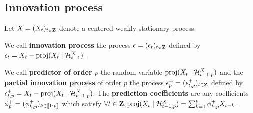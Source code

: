 \subsection{Innovation process}

	Let $X = (X_t)_{t \in \mathbf{Z}}$ denote a centered weakly stationary process.

	\begin{defn}
		We call \textbf{innovation process} the process $\epsilon = (\epsilon_t)_{t \in \mathbf{Z}}$ defined by $\epsilon_t = X_t - \operatorname{proj}(X_t \mid \mathcal{H}_{t - 1}^X)$.
	\end{defn}

	\begin{defn}
		We call \textbf{predictor of order $p$} the random variable $\operatorname{proj}(X_t \mid \mathcal{H}_{t - 1,p}^X)$ and the \textbf{partial innovation process} of order $p$ the process $\epsilon_p^+ = (\epsilon_{t,p}^+)_{t \in \mathbf{Z}}$ defined by $\epsilon_{t,p}^+ = X_t - \operatorname{proj}(X_t \mid \mathcal{H}_{t - 1,p}^X)$.
		The \textbf{prediction coefficients} are any coefficients $\phi_p^+ = (\phi_{k,p}^+)_{k \in \mathopen{[\![}1\mathclose{}\mathpunct{};p\mathclose{]\!]}}$ which satisfy $\forall t \in \mathbf{Z}, \operatorname{proj}(X_t \mid \mathcal{H}_{t - 1,p}^X) = \sum_{k = 1}^p \phi_{k,p}^+ X_{t - k}$.
	\end{defn}